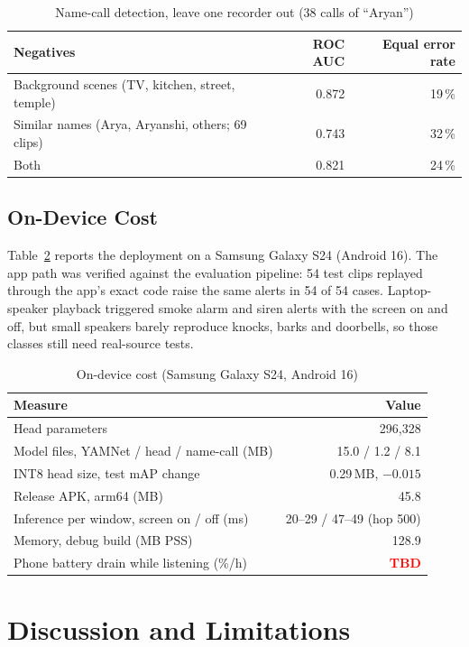 \documentclass{svproc}
\newcommand{\tbd}{\textcolor{red}{\textbf{TBD}}}
\begin{document}
\begin{table}[t]
\caption{Name-call detection, leave one recorder out (38 calls of ``Aryan'')}
\label{tab:name}
\centering
\begin{tabular}{@{}lrr@{}}
\toprule
Negatives & ROC AUC & Equal error rate \\
\midrule
Background scenes (TV, kitchen, street, temple) & 0.872 & 19\,\% \\
Similar names (Arya, Aryanshi, others; 69 clips) & 0.743 & 32\,\% \\
Both & 0.821 & 24\,\% \\
\bottomrule
\end{tabular}
\end{table}

\subsection{On-Device Cost}
Table~\ref{tab:device} reports the deployment on a Samsung Galaxy S24 (Android 16). The app path was verified against the evaluation pipeline: 54 test clips replayed through the app's exact code raise the same alerts in 54 of 54 cases. Laptop-speaker playback triggered smoke alarm and siren alerts with the screen on and off, but small speakers barely reproduce knocks, barks and doorbells, so those classes still need real-source tests.

\begin{table}[t]
\caption{On-device cost (Samsung Galaxy S24, Android 16)}
\label{tab:device}
\centering
\begin{tabular}{@{}lr@{}}
\toprule
Measure & Value \\
\midrule
Head parameters & 296,328 \\
Model files, YAMNet / head / name-call (MB) & 15.0 / 1.2 / 8.1 \\
INT8 head size, test mAP change & 0.29\,MB, $-0.015$ \\
Release APK, arm64 (MB) & 45.8 \\
Inference per window, screen on / off (ms) & 20--29 / 47--49 (hop 500) \\
Memory, debug build (MB PSS) & 128.9 \\
Phone battery drain while listening (\%/h) & \tbd \\
\bottomrule
\end{tabular}
\end{table}

\section{Discussion and Limitations}\label{sec:limits}
\end{document}
